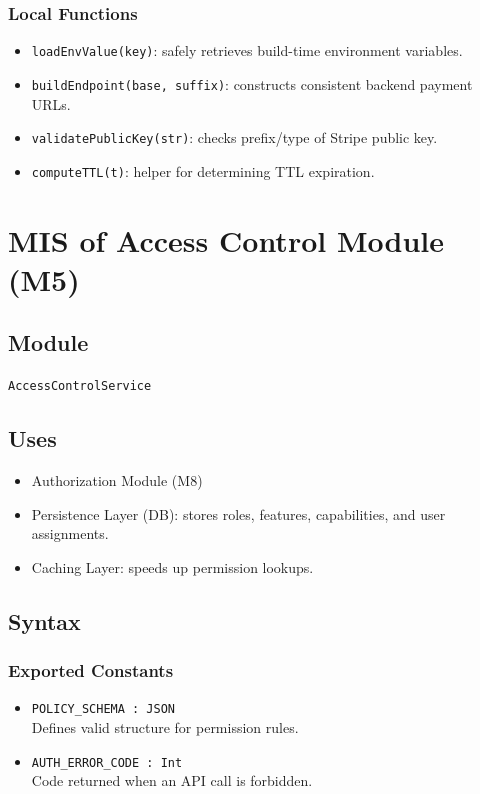 \documentclass[12pt, titlepage]{article}
\begin{document}
\subsubsection{Local Functions}

\begin{itemize}
    \item \texttt{loadEnvValue(key)}: safely retrieves build-time environment variables.
    \item \texttt{buildEndpoint(base, suffix)}: constructs consistent backend payment URLs.
    \item \texttt{validatePublicKey(str)}: checks prefix/type of Stripe public key.
    \item \texttt{computeTTL(t)}: helper for determining TTL expiration.
\end{itemize}

\section{MIS of Access Control Module (M5)}

\subsection{Module}

\texttt{AccessControlService}

\subsection{Uses}

\begin{itemize}
    \item Authorization Module (M8)
    \item Persistence Layer (DB): stores roles, features, capabilities, and user assignments.
    \item Caching Layer: speeds up permission lookups.
\end{itemize}

\subsection{Syntax}

\subsubsection{Exported Constants}

\begin{itemize}
    \item \texttt{POLICY\_SCHEMA : JSON}\\
    Defines valid structure for permission rules.
    \item \texttt{AUTH\_ERROR\_CODE : Int}\\
    Code returned when an API call is forbidden.
\end{itemize}
\end{document}
